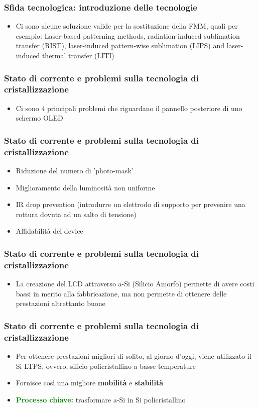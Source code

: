 \documentclass[12pt]{beamer}
\begin{document}
	\begin{frame}
		\frametitle{Sfida tecnologica: introduzione delle tecnologie}
		\begin{itemize}
			\item Ci sono alcune soluzione valide per la sostituzione della FMM, quali per esempio: Laser-based patterning methods, radiation-induced sublimation transfer (RIST), laser-induced pattern-wise sublimation (LIPS) and laser-induced thermal transfer (LITI)
		\end{itemize}
	\end{frame}
	\begin{frame}
		\frametitle{Stato di corrente e problemi sulla tecnologia di cristallizzazione}
		\begin{itemize}
			\item Ci sono 4 principali problemi che riguardano il pannello posteriore di uno schermo OLED
		\end{itemize}
	\end{frame}
	\begin{frame}
		\frametitle{Stato di corrente e problemi sulla tecnologia di cristallizzazione}
		\begin{itemize}
			\item Riduzione del numero di 'photo-mask'
			\pause
			\item Miglioramento della luminosità non uniforme
			\pause
			\item IR drop prevention (introdurre un elettrodo di supporto per prevenire una rottura dovuta ad un salto di tensione)
			\pause
			\item Affidabilità del device
		\end{itemize}
	\end{frame}
	\begin{frame}
		\frametitle{Stato di corrente e problemi sulla tecnologia di cristallizzazione}
		\begin{itemize}
			\item La creazione del LCD attraverso a-Si (Silicio Amorfo) permette di avere costi bassi in merito alla fabbricazione, ma non permette di ottenere delle prestazioni altrettanto buone
		\end{itemize}
	\end{frame}
	\begin{frame}
		\frametitle{Stato di corrente e problemi sulla tecnologia di cristallizzazione}
		\begin{itemize}
			\item Per ottenere prestazioni migliori di solito, al giorno d'oggi, viene utilizzato il Si LTPS, ovvero, silicio policristallino a basse temperature
			\pause
			\item Fornisce così una migliore \textbf{mobilità} e \textbf{stabilità}
			\pause
			\item \textbf{\textcolor{green}{Processo chiave:}} trasformare a-Si in Si policristallino
		\end{itemize}
	\end{frame}
\end{document}
